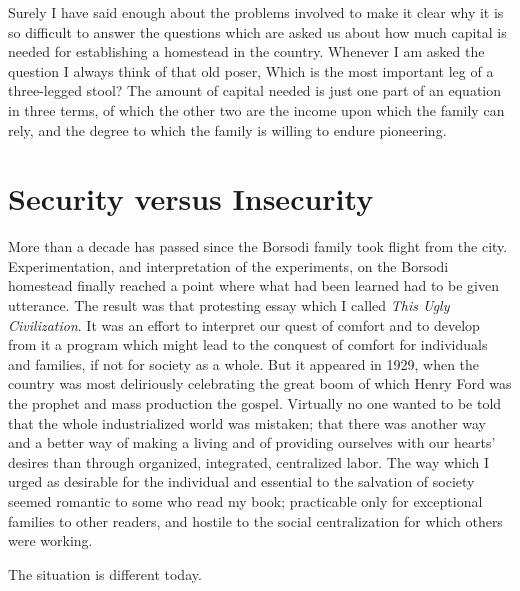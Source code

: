 \documentclass{book}
\begin{document}
Surely I have said enough about the problems involved to make it clear why it is so difficult to answer the questions which are asked us about how much capital is needed for establishing a homestead in the country. Whenever I am asked the question I always think of that old poser, Which is the most important leg of a three-legged stool? The amount of capital needed is just one part of an equation in three terms, of which the other two are the income upon which the family can rely, and the degree to which the family is willing to endure pioneering.

\chapter{Security versus Insecurity}
\label{chapter-9}
More than a decade has passed since the Borsodi family took flight from the city. Experimentation, and interpretation of the experiments, on the Borsodi homestead finally reached a point where what had been learned had to be given utterance. The result was that protesting essay which I called \emph{This Ugly Civilization}. It was an effort to interpret our quest of comfort and to develop from it a program which might lead to the conquest of comfort for individuals and families, if not for society as a whole. But it appeared in 1929, when the country was most deliriously celebrating the great boom of which Henry Ford was the prophet and mass production the gospel. Virtually no one wanted to be told that the whole industrialized world was mistaken; that there was another way and a better way of making a living and of providing ourselves with our hearts’ desires than through organized, integrated, centralized labor. The way which I urged as desirable for the individual and essential to the salvation of society seemed romantic to some who read my book; practicable only for exceptional families to other readers, and hostile to the social centralization for which others were working.

The situation is different today.
\end{document}
